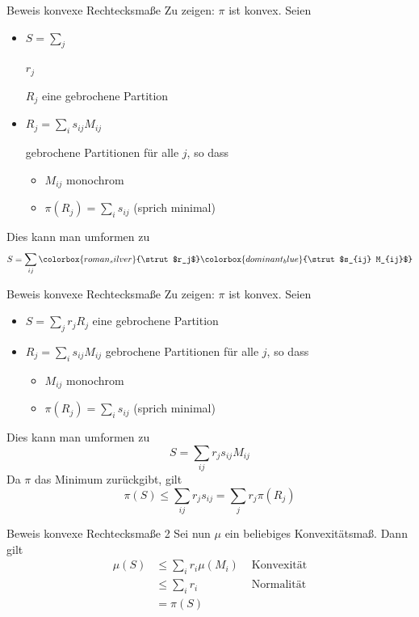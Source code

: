 \begin{frame}[t,noframenumbering]{Beweis konvexe Rechtecksma\ss{}e}
    Zu zeigen: $\pi$ ist konvex.
    Seien
    \begin{itemize}
        \item $S = \sum_{j} $ \colorbox{roman_silver}{\strut$r_j$} $R_j$ eine gebrochene Partition
        \item \colorbox{dominant_blue}{\strut$R_j = \sum_{i} s_{ij} M_{ij}$} gebrochene Partitionen f\"ur alle $j$, so dass
        \begin{itemize}
            \item $M_{ij}$ monochrom
            \item $\pi(R_j) = \sum_i s_{ij}$ (sprich minimal) 
        \end{itemize}
    \end{itemize}
    Dies kann man umformen zu 
    \[
        S = \sum_{ij} \colorbox{roman_silver}{\strut$r_j$} \colorbox{dominant_blue}{\strut$s_{ij} M_{ij}$}
    \]
\end{frame}

\begin{frame}[t,noframenumbering]{Beweis konvexe Rechtecksma\ss{}e}
    Zu zeigen: $\pi$ ist konvex.
    Seien
    \begin{itemize}
        \item $S = \sum_{j} r_j R_j$ eine gebrochene Partition
        \item $R_j = \sum_{i} s_{ij} M_{ij}$ gebrochene Partitionen f\"ur alle $j$, so dass
        \begin{itemize}
            \item $M_{ij}$ monochrom
            \item $\pi(R_j) = \sum_i s_{ij}$ (sprich minimal) 
        \end{itemize}
    \end{itemize}
    Dies kann man umformen zu 
    \[
        S = \sum_{ij} r_j s_{ij} M_{ij}
    \]
    Da $\pi$ das Minimum zur\"uckgibt, gilt
    \[
        \pi(S) \leq \sum_{ij} r_j s_{ij} = \sum_j r_j \pi(R_j)
    \]
\end{frame}

\begin{frame}[t]{Beweis konvexe Rechtecksma\ss{}e 2}
    Sei nun $\mu$ ein beliebiges Konvexit\"atsma\ss{}. Dann gilt
    \begin{align*}
        \mu(S) &\leq \sum_i r_i \mu(M_i) &\text{ Konvexit\"at}\\
        &\leq \sum_{i} r_i &\text{ Normalit\"at}\\
        &= \pi(S)
    \end{align*}
\end{frame}
